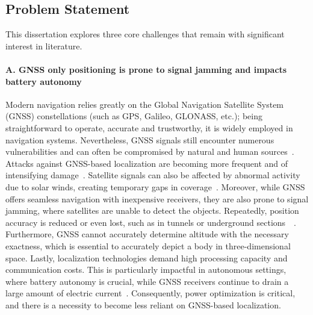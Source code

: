 \subsection{Problem Statement}
This dissertation explores three core challenges that remain with significant interest in literature.

\paragraph{A. GNSS only positioning is prone to signal jamming and impacts battery autonomy}
Modern navigation relies greatly on the Global Navigation Satellite System (GNSS) constellations (such as GPS, Galileo, GLONASS, etc.); being straightforward to operate, accurate and trustworthy, it is widely employed in navigation systems. Nevertheless, GNSS signals still encounter numerous vulnerabilities and can often be compromised by natural and human sources~\cite{ioannides2016known}. Attacks against GNSS-based localization are becoming more frequent and of intensifying damage~\cite{papadimitratos2008protection}. Satellite signals can also be affected by abnormal activity due to solar winds, creating temporary gaps in coverage~\cite{amin2016vulnerabilities}.
Moreover, while GNSS offers seamless navigation with inexpensive receivers, they are also prone to signal jamming, where satellites are unable to detect the objects. Repeatedly, position accuracy is reduced or even lost, such as in tunnels or underground sections~\cite{pinker1999vulnerability}~\cite{omar2016integration}. Furthermore, GNSS cannot accurately determine altitude with the necessary exactness, which is essential to accurately depict a body in three-dimensional space.
Lastly, localization technologies demand high processing capacity and communication costs. This is particularly impactful in autonomous settings, where battery autonomy is crucial, while GNSS receivers continue to drain a large amount of electric current~\cite{lo2016greener}. Consequently, power optimization is critical, and there is a necessity to become less reliant on GNSS-based localization.


